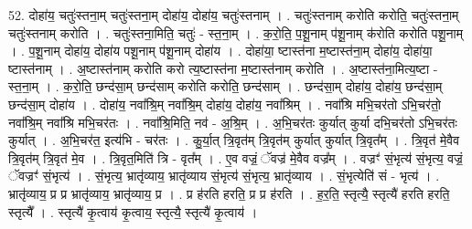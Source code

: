 \documentclass[17pt]{extarticle}
\begin{document}
52. दोहा॑य॒ चतुः॑स्तना॒म् चतुः॑स्तना॒म् दोहा॑य॒ दोहा॑य॒ चतुः॑स्तनाम् । . चतुः॑स्तनाम् करोति करोति॒ चतुः॑स्तना॒म् चतुः॑स्तनाम् करोति । . चतुः॑स्तना॒मिति॒ चतुः॑ - स्त॒ना॒म् । . क॒रो॒ति॒ प॒शू॒नाम् प॑शू॒नाम् क॑रोति करोति पशू॒नाम् । . प॒शू॒नाम् दोहा॑य॒ दोहा॑य पशू॒नाम् प॑शू॒नाम् दोहा॑य । . दोहा॑या॒ ष्टास्त॑ना म॒ष्टास्त॑ना॒म् दोहा॑य॒ दोहा॑या॒ ष्टास्त॑नाम् । . अ॒ष्टास्त॑नाम् करोति करो त्य॒ष्टास्त॑ना म॒ष्टास्त॑नाम् करोति । . अ॒ष्टास्त॑ना॒मित्य॒ष्टा - स्त॒ना॒म् । . क॒रो॒ति॒ छन्द॑सा॒म् छन्द॑साम् करोति करोति॒ छन्द॑साम् । . छन्द॑सा॒म् दोहा॑य॒ दोहा॑य॒ छन्द॑सा॒म् छन्द॑सा॒म् दोहा॑य । . दोहा॑य॒ नवा᳚श्रि॒म् नवा᳚श्रि॒म् दोहा॑य॒ दोहा॑य॒ नवा᳚श्रिम् । . नवा᳚श्रि मभि॒चर॑तो ऽभि॒चर॑तो॒ नवा᳚श्रि॒म् नवा᳚श्रि मभि॒चर॑तः । . नवा᳚श्रि॒मिति॒ नव॑ - अ॒श्रि॒म् । . अ॒भि॒चर॑तः कुर्यात् कुर्या दभि॒चर॑तो ऽभि॒चर॑तः कुर्यात् । . अ॒भि॒चर॑त॒ इत्य॑भि - चर॑तः । . कु॒र्या॒त् त्रि॒वृत॑म् त्रि॒वृत॑म् कुर्यात् कुर्यात् त्रि॒वृत᳚म् । . त्रि॒वृत॑ मे॒वैव त्रि॒वृत॑म् त्रि॒वृत॑ मे॒व । . त्रि॒वृत॒मिति॑ त्रि - वृत᳚म् । . ए॒व वज्रं॒ ॅवज्र॑ मे॒वैव वज्र᳚म् । . वज्रꣳ॑ सं॒भृत्य॑ सं॒भृत्य॒ वज्रं॒ ॅवज्रꣳ॑ सं॒भृत्य॑ । . सं॒भृत्य॒ भ्रातृ॑व्याय॒ भ्रातृ॑व्याय सं॒भृत्य॑ सं॒भृत्य॒ भ्रातृ॑व्याय । . सं॒भृत्येति॑ सं - भृत्य॑ । . भ्रातृ॑व्याय॒ प्र प्र भ्रातृ॑व्याय॒ भ्रातृ॑व्याय॒ प्र । . प्र ह॑रति हरति॒ प्र प्र ह॑रति । . ह॒र॒ति॒ स्तृत्यै॒ स्तृत्यै॑ हरति हरति॒ स्तृत्यै᳚ । . स्तृत्यै॑ कृ॒त्वाय॑ कृ॒त्वाय॒ स्तृत्यै॒ स्तृत्यै॑ कृ॒त्वाय॑ । \newline
\end{document}
